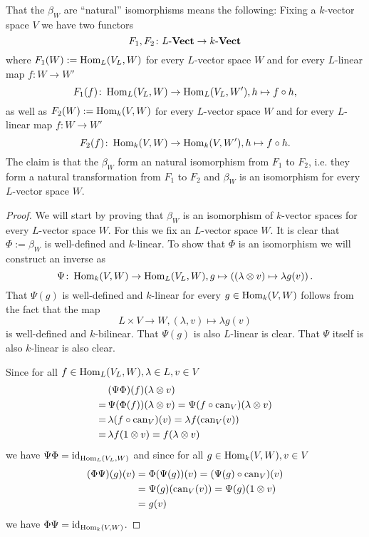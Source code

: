 That the $\beta_W$ are ``natural'' isomorphisms means the following: Fixing a $k$-vector space $V$ we have two functors
\[
 F_1, F_2 \colon L\text{-}\mathbf{Vect} \to k\text{-}\mathbf{Vect}
\]
where $F_1(W) := \operatorname{Hom}_L(V_L,W)$ for every $L$-vector space $W$ and for every $L$-linear map $f \colon W \to W'$
\[
 F_1(f) \colon \operatorname{Hom}_L(V_L, W) \to \operatorname{Hom}_L(V_L, W'), h \mapsto f \circ h,
\]
as well as $F_2(W) := \operatorname{Hom}_k(V,W)$ for every $L$-vector space $W$ and for every $L$-linear map $f \colon W \to W'$
\[
 F_2(f) \colon \operatorname{Hom}_k(V,W) \to \operatorname{Hom}_k(V,W'), h \mapsto f \circ h.
\]
The claim is that the $\beta_W$ form an natural isomorphism from $F_1$ to $F_2$, i.e. they form a natural transformation from $F_1$ to $F_2$ and $\beta_W$ is an isomorphism for every $L$-vector space $W$.


\begin{proof}
 We will start by proving that $\beta_W$ is an isomorphism of $k$-vector spaces for every $L$-vector space $W$. For this we fix an $L$-vector space $W$. It is clear that $\Phi := \beta_W$ is well-defined and $k$-linear. To show that $\Phi$ is an isomorphism we will construct an inverse as
 \[
  \Psi \colon \operatorname{Hom}_k(V,W) \to \operatorname{Hom}_L(V_L, W), g \mapsto \left( (\lambda \otimes v) \mapsto \lambda g(v) \right).
 \]
 That $\Psi(g)$ is well-defined and $k$-linear for every $g \in \operatorname{Hom}_k(V,W)$ follows from the fact that the map
 \[
  L \times V \to W, (\lambda, v) \mapsto \lambda g(v)
 \]
 is well-defined and $k$-bilinear. That $\Psi(g)$ is also $L$-linear is clear. That $\Psi$ itself is also $k$-linear is also clear.
 
 Since for all $f \in \operatorname{Hom}_L(V_L,W), \lambda \in L, v \in V$
 \begin{align*}
   &\,(\Psi \Phi)(f)(\lambda \otimes v) \\
  =&\,\Psi(\Phi(f))(\lambda \otimes v)
  =   \Psi(f \circ \operatorname{can}_V)(\lambda \otimes v) \\
  =&\,\lambda (f \circ \operatorname{can}_V)(v)
  =   \lambda f(\operatorname{can}_V(v)) \\
  =&\,\lambda f(1 \otimes v)
  =   f (\lambda \otimes v)
 \end{align*}
 we have $\Psi \Phi = \operatorname{id}_{\operatorname{Hom}_L(V_L, W)}$ and since for all $g \in \operatorname{Hom}_k(V,W), v \in V$
 \begin{align*}
  (\Phi \Psi)(g)(v)
  &= \Phi(\Psi(g))(v)
  = (\Psi(g) \circ \operatorname{can}_V)(v) \\
  &= \Psi(g)(\operatorname{can}_V(v))
  = \Psi(g)(1 \otimes v) \\
  &= g(v)
 \end{align*}
 we have $\Phi \Psi = \operatorname{id}_{\operatorname{Hom}_k(V,W)}$.
 

\end{proof}
